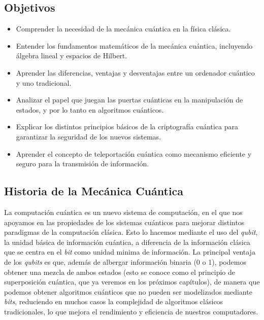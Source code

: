 \documentclass{article}
\numberwithin{equation}{section} %
\begin{document}
        \subsection{Objetivos}

        \vspace{5mm}

        \begin{itemize}
            \item Comprender la necesidad de la mecánica cuántica en la física clásica.
            \item Entender los fundamentos matemáticos de la mecánica cuántica, incluyendo álgebra lineal y espacios de Hilbert.
            \item Aprender las diferencias, ventajas y desventajas entre un ordenador cuántico y uno tradicional.
            \item Analizar el papel que juegan las puertas cuánticas en la manipulación de estados, y por lo tanto en algoritmos cuánticos.
            \item Explicar los distintos principios básicos de la criptografía cuántica para garantizar la seguridad de los nuevos sistemas.
            \item Aprender el concepto de teleportación cuántica como mecanismo eficiente y seguro para la transmisión de información.
        \end{itemize}

        \vspace{5mm}

        \subsection{Historia de la Mecánica Cuántica}

        \vspace{5mm}

        La computación cuántica es un nuevo sistema de computación, en el que nos apoyamos en las propiedades de los sistemas cuánticos para mejorar distintos paradigmas de la computación clásica. Esto lo hacemos mediante el uso del \textit{qubit}, la unidad básica de información cuántica, a diferencia de la información clásica que se centra en el \textit{bit} como unidad minima de información. La principal ventaja de los \textit{qubits} es que, además de albergar información binaria (0 o 1), podemos obtener una mezcla de ambos estados (esto se conoce como el principio de superposición cuántica, que ya veremos en los próximos capítulos), de manera que podemos obtener algoritmos cuánticos que no pueden ser modelizados mediante \textit{bits}, reduciendo en muchos casos la complejidad de algoritmos clásicos tradicionales, lo que mejora el rendimiento y eficiencia de nuestros computadores.
\end{document}
